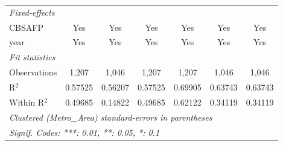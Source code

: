 \documentclass{article}
\begin{document}
\begin{appendices}
\begin{table}[ht]
{\begin{tabular}{lcccccc}
   \midrule
   \emph{Fixed-effects}\\
   CBSAFP                                          & Yes            & Yes            & Yes            & Yes            & Yes            & Yes\\  
   year                                            & Yes            & Yes            & Yes            & Yes            & Yes            & Yes\\  
   \midrule
   \emph{Fit statistics}\\
   Observations                                    & 1,207          & 1,046          & 1,207          & 1,207          & 1,046          & 1,046\\  
   R$^2$                                           & 0.57525        & 0.56207        & 0.57525        & 0.69905        & 0.63743        & 0.63743\\  
   Within R$^2$                                    & 0.49685        & 0.14822        & 0.49685        & 0.62122        & 0.34119        & 0.34119\\  
   \midrule \midrule
   \multicolumn{7}{l}{\emph{Clustered (Metro_Area) standard-errors in parentheses}}\\
   \multicolumn{7}{l}{\emph{Signif. Codes: ***: 0.01, **: 0.05, *: 0.1}}\\
\end{tabular}}
\end{table}

\end{appendices}
\end{document}
